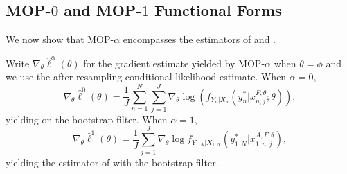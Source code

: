 \documentclass{article}
\begin{document}
\subsection{MOP-$0$ and MOP-$1$ Functional Forms}

We now show that MOP-$\alpha$ encompasses the estimators of \cite{blei2018vsmc} and \cite{poyiadjis11}. 

\begin{thm}
    \label{thm:mop-functional-forms}
    Write $\nabla_\theta \hat\ell^\alpha(\theta)$ for the gradient estimate yielded by MOP-$\alpha$ when $\theta=\phi$ and we use the after-resampling conditional likelihood estimate. When $\alpha=0$,
    \begin{equation}
        \nabla_\theta \hat\ell^0(\theta) 
        = \frac{1}{J} \sum_{n=1}^N \sum_{j=1}^J \nabla_\theta \log\left(f_{Y_n|X_{n}}(y_n^*|x_{n,j}^{F, \theta}; \theta)\right),
    \end{equation}
    yielding \cite{blei2018vsmc} on the bootstrap filter. When $\alpha=1$,
    \begin{equation}
        \nabla_\theta \hat{\ell}^1(\theta) 
        = \frac{1}{J}\sum_{j=1}^J \nabla_\theta \log f_{Y_{1:N}|X_{1:N}}\left(y_{1:N}^* | x_{1:n,j}^{A, F,\theta}\right),
    \end{equation}
    yielding the estimator of \cite{poyiadjis11} with the bootstrap filter.
\end{thm}
\end{document}
